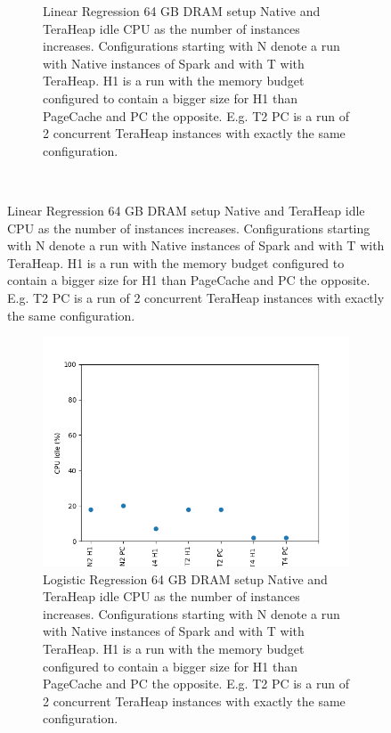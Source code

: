 \begin{figure}[htbp]
\begin{subfigure}[b]{0.48\textwidth}
    \caption{Linear Regression 64 GB DRAM setup Native and TeraHeap
    idle CPU as the number of instances increases. Configurations
    starting with N denote a run with Native instances of Spark and
    with T with TeraHeap. H1 is a run with the memory budget
    configured to contain a bigger size for H1 than PageCache and PC
    the opposite. E.g. T2 PC is a run of 2 concurrent TeraHeap
    instances with exactly the same configuration.}
	\label{fig:linr_64_idle}
	\end{subfigure}\\[1em]
\end{figure}

\begin{figure}[htbp]
	\centering
    \begin{subfigure}[b]{0.48\textwidth}
    \includegraphics[width=\linewidth]{./fig/LOGR_64_IDLE.png}
    \caption{Logistic Regression 64 GB DRAM setup Native and TeraHeap
    idle CPU as the number of instances increases. Configurations
    starting with N denote a run with Native instances of Spark and
    with T with TeraHeap. H1 is a run with the memory budget
    configured to contain a bigger size for H1 than PageCache and PC
    the opposite. E.g. T2 PC is a run of 2 concurrent TeraHeap
    instances with exactly the same configuration.}
    \label{fig:logr_64_idle}
    \end{subfigure}
\begin{subfigure}[b]{0.48\textwidth}

\end{subfigure}
\end{figure}
